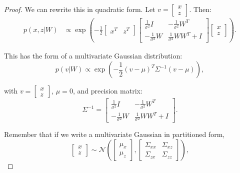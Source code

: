 \begin{proof}
    We can rewrite this in quadratic form. Let $v = \begin{bmatrix} x \\ z \end{bmatrix}$. Then:
    \begin{align}
      p(x, z | W) &\propto \exp\left(-\frac{1}{2}\begin{bmatrix} x^T & z^T \end{bmatrix} \begin{bmatrix} \frac{1}{\sigma^2}I & -\frac{1}{\sigma^2}W^T \\ -\frac{1}{\sigma^2}W & \frac{1}{\sigma^2}WW^T + I \end{bmatrix} \begin{bmatrix} x \\ z \end{bmatrix}\right).
    \end{align}

    This has the form of a multivariate Gaussian distribution:
    \begin{equation}
      p(v | W) \propto \exp\left(-\frac{1}{2}(v - \mu)^T\Sigma^{-1}(v - \mu)\right),
    \end{equation}

    with $v = \begin{bmatrix} x \\ z \end{bmatrix}$, $\mu = 0$, and precision matrix:
    \begin{equation}
      \Sigma^{-1} = \begin{bmatrix} \frac{1}{\sigma^2}I & -\frac{1}{\sigma^2}W^T \\ -\frac{1}{\sigma^2}W & \frac{1}{\sigma^2}WW^T + I \end{bmatrix}.
    \end{equation}

    Remember that if we write a multivariate Gaussian in partitioned form,
    \begin{equation}
      \begin{bmatrix} x \\ z \end{bmatrix} \sim \mathcal{N}\left(\begin{bmatrix} \mu_x \\ \mu_z \end{bmatrix}, \begin{bmatrix} \Sigma_{xx} & \Sigma_{xz} \\ \Sigma_{zx} & \Sigma_{zz} \end{bmatrix}\right),
    \end{equation}


\end{proof}
